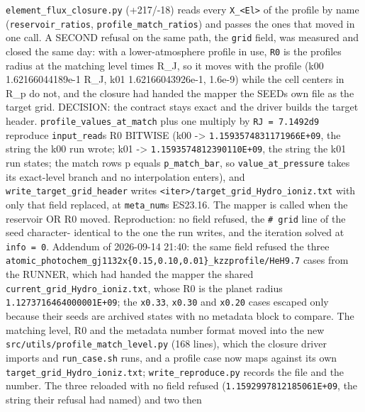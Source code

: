 \documentclass[english,a4paper]{my_memo}
\begin{document}
\begin{itemize}
  \texttt{element\_flux\_closure.py} (+217/-18) reads every \texttt{X\_\textless{}El\textgreater{}} of the profile by
  name (\texttt{reservoir\_ratios}, \texttt{profile\_match\_ratios}) and passes the ones that
  moved in one call. A SECOND refusal on the same path, the \texttt{grid} field, was
  measured and closed the same day: with a lower-atmosphere profile in use,
  \texttt{R0} is the profile\textquotesingle s radius at the matching level times R\_J, so it moves
  with the profile (k00 1.62166044189e-1 R\_J, k01 1.62166043926e-1, 1.6e-9)
  while the cell centers in R\_p do not, and the closure had handed the mapper
  the SEED\textquotesingle s own file as the target grid. DECISION: the contract stays exact
  and the driver builds the target header. \texttt{profile\_values\_at\_match} plus one
  multiply by \texttt{RJ\ =\ 7.1492d9} reproduce \texttt{input\_read}\textquotesingle s R0 BITWISE (k00 -\textgreater{}
  \texttt{1.1593574831171966E+09}, the string the k00 run wrote; k01 -\textgreater{}
  \texttt{1.1593574812390110E+09}, the string the k01 run states; the match row\textquotesingle s p
  equals \texttt{p\_match\_bar}, so \texttt{value\_at\_pressure} takes its exact-level branch
  and no interpolation enters), and \texttt{write\_target\_grid\_header} writes
  \texttt{\textless{}iter\textgreater{}/target\_grid\_Hydro\_ioniz.txt} with only that field replaced, at
  \texttt{meta\_num}\textquotesingle s ES23.16. The mapper is called when the reservoir OR R0 moved.
  Reproduction: no field refused, the \texttt{\#\ grid} line of the seed character-
  identical to the one the run writes, and the iteration solved at
  \texttt{info\ =\ 0}. Addendum of 2026-09-14 21:40: the same field refused the three
  \texttt{atomic\_photochem\_gj1132x\{0.15,0.10,0.01\}\_kzzprofile/HeH9.7} cases from the
  RUNNER, which had handed the mapper the shared
  \texttt{current\_grid\_Hydro\_ioniz.txt}, whose R0 is the planet radius
  \texttt{1.1273716464000001E+09}; the \texttt{x0.33}, \texttt{x0.30} and \texttt{x0.20} cases escaped
  only because their seeds are archived states with no metadata block to
  compare. The matching level, R0 and the metadata number format moved into
  the new \texttt{src/utils/profile\_match\_level.py} (168 lines), which the closure
  driver imports and \texttt{run\_case.sh} runs, and a profile case now maps against
  its own \texttt{target\_grid\_Hydro\_ioniz.txt}; \texttt{write\_reproduce.py} records the file
  and the number. The three reloaded with no field refused
  (\texttt{1.1592997812185061E+09}, the string their refusal had named) and two then

\end{itemize}
\end{document}
